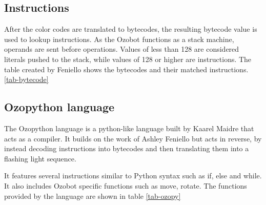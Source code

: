 \documentclass[oneside,%
                    author={Malak Hajji},
                    degree={BSc},
                    title={Designing An Accessible Ozobot Programming Platform for Students},
                  subtitle={With Mixed Visual Abilities}]{dissertation}
\begin{document}
\subsection{Instructions}
After the color codes are translated to bytecodes, the resulting bytecode value is used to lookup instructions. As the Ozobot functions as a stack machine, operands are sent before operations.
Values of less than 128 are considered literals pushed to the stack, while values of 128 or higher are instructions. The table created by Feniello shows the bytecodes and their matched instructions. \ref{tab-bytecode}

\subsection{Ozopython language}
The Ozopython language is a python-like language built by Kaarel Maidre\cite{ozopy} that acts as a compiler. It builds on the work of Ashley Feniello but acts in reverse, by instead decoding instructions into bytecodes and then translating them into a flashing light sequence. 

It features several instructions similar to Python syntax such as if, else and while. It also includes Ozobot specific functions such as move, rotate. The functions provided by the language are shown in table \ref{tab-ozopy}
\end{document}
